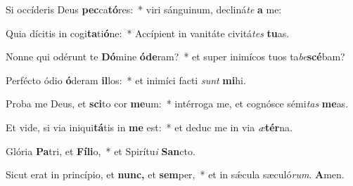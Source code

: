 \item Si occíderis Deus \textbf{pec}ca\textbf{tó}res:~* viri sánguinum, decliná\tinyhspace\textit{te} \textbf{a} me:
\item Quia dícitis in cogi\textbf{ta}ti\textbf{ó}ne:~* Accípient in vanitáte civitá\tinyhspace\textit{tes} \textbf{tu}as.
\item Nonne qui odérunt te \textbf{Dó}mine \textbf{ó}\textbf{de}ram?~* et super inimícos tuos ta\textit{be}\textbf{scé}bam?
\item Perfécto ódio \textbf{ó}deram \textbf{il}los:~* et inimíci facti \textit{sunt} \textbf{mi}hi.
\item Proba me Deus, et \textbf{sci}to cor \textbf{me}um:~* intérroga me, et cognósce sémi\tinyhspace\textit{tas} \textbf{me}as.
\item Et vide, si via iniqui\textbf{tá}tis in \textbf{me} est:~* et deduc me in via \textit{æ}\textbf{tér}na.
\item Glória \textbf{Pa}tri, et \textbf{Fí}\textbf{li}o,~* et Spirítu\textit{i} \textbf{San}cto.
\item Sicut erat in princípio, et \textbf{nunc,} et \textbf{sem}per,~* et in sǽcula sæculó\textit{rum}. \textbf{A}men.
